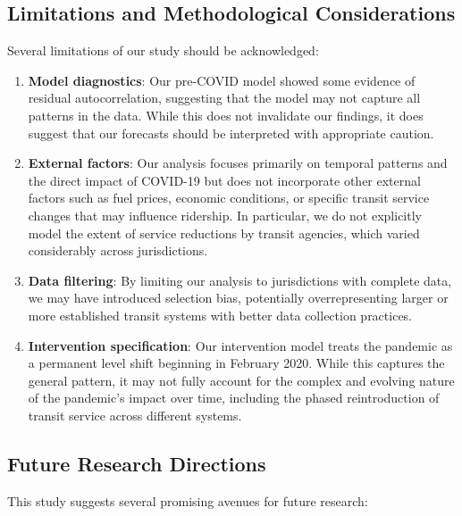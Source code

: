 \documentclass[11pt]{article}
\begin{document}
\subsection{Limitations and Methodological Considerations}

Several limitations of our study should be acknowledged:

\begin{enumerate}
\item \textbf{Model diagnostics}: Our pre-COVID model showed some evidence of residual autocorrelation, suggesting that the model may not capture all patterns in the data. While this does not invalidate our findings, it does suggest that our forecasts should be interpreted with appropriate caution.

\item \textbf{External factors}: Our analysis focuses primarily on temporal patterns and the direct impact of COVID-19 but does not incorporate other external factors such as fuel prices, economic conditions, or specific transit service changes that may influence ridership. In particular, we do not explicitly model the extent of service reductions by transit agencies, which varied considerably across jurisdictions.

\item \textbf{Data filtering}: By limiting our analysis to jurisdictions with complete data, we may have introduced selection bias, potentially overrepresenting larger or more established transit systems with better data collection practices.

\item \textbf{Intervention specification}: Our intervention model treats the pandemic as a permanent level shift beginning in February 2020. While this captures the general pattern, it may not fully account for the complex and evolving nature of the pandemic's impact over time, including the phased reintroduction of transit service across different systems.
\end{enumerate}

\subsection{Future Research Directions}

This study suggests several promising avenues for future research:
\end{document}
